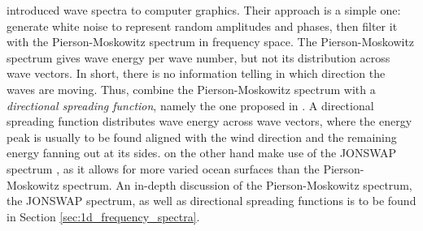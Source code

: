 \cite{Mastin:1987} introduced wave spectra to computer graphics. Their approach
is a simple one: generate white noise to represent random amplitudes and phases,
then filter it with the Pierson-Moskowitz spectrum
\citep{article:PiersonMoskowitz1964} in frequency space. The Pierson-Moskowitz
spectrum gives wave energy per wave number, but not its distribution across
wave vectors. In short, there is no information telling in which direction the
waves are moving. Thus, \citeauthor{Mastin:1987} combine the Pierson-Moskowitz
spectrum with a \emph{directional spreading function}, namely the one proposed
in \cite{article:Hasselmann1980}. A directional
spreading function distributes wave energy across wave vectors, where
the energy peak is usually to be found aligned with the wind direction and the
remaining energy fanning out at its sides.
\cite{Premoze:2000} on the other hand make use of the JONSWAP spectrum
\citep{article:Hasselman1973}, as it allows for more varied ocean surfaces than
the Pierson-Moskowitz spectrum.
An in-depth discussion of the Pierson-Moskowitz spectrum, the JONSWAP spectrum,
as well as directional spreading functions is to be found in Section
\ref{sec:1d_frequency_spectra}.

